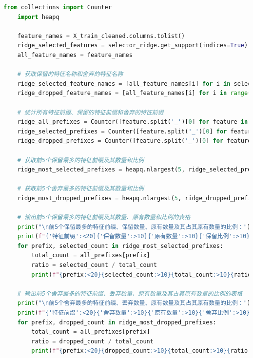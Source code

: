 \documentclass[
    report,     %
    oneside,    %
    UTF8,       %
    zihao=-4    %
]{config} %
\begin{document}
\begin{lstlisting}[label=code:feature_retention_ridge, language=Python, caption=Ridge：Ridge:查看特征选择过程中保留与舍弃的特征]
    from collections import Counter
    import heapq
    
    feature_names = X_train_cleaned.columns.tolist()
    ridge_selected_features = selector_ridge.get_support(indices=True)
    all_feature_names = feature_names
    
    # 获取保留的特征名称和舍弃的特征名称
    ridge_selected_feature_names = [all_feature_names[i] for i in selected_features]
    ridge_dropped_feature_names = [all_feature_names[i] for i in range(X_train_cleaned.shape[1]) if i not in selected_features]
    
    # 统计所有特征前缀、保留的特征前缀和舍弃的特征前缀
    ridge_all_prefixes = Counter([feature.split('_')[0] for feature in all_feature_names])
    ridge_selected_prefixes = Counter([feature.split('_')[0] for feature in ridge_selected_feature_names])
    ridge_dropped_prefixes = Counter([feature.split('_')[0] for feature in ridge_dropped_feature_names])
    
    # 获取前5个保留最多的特征前缀及其数量和比例
    ridge_most_selected_prefixes = heapq.nlargest(5, ridge_selected_prefixes.items(), key=lambda x: x[1])
    
    # 获取前5个舍弃最多的特征前缀及其数量和比例
    ridge_most_dropped_prefixes = heapq.nlargest(5, ridge_dropped_prefixes.items(), key=lambda x: x[1])
    
    # 输出前5个保留最多的特征前缀及其数量、原有数量和比例的表格
    print("\n前5个保留最多的特征前缀、保留数量、原有数量及其占其原有数量的比例：")
    print(f"{'特征前缀':<20}{'保留数量':>10}{'原有数量':>10}{'保留比例':>10}")
    for prefix, selected_count in ridge_most_selected_prefixes:
        total_count = all_prefixes[prefix]
        ratio = selected_count / total_count
        print(f"{prefix:<20}{selected_count:>10}{total_count:>10}{ratio:>10.2%}")
    
    # 输出前5个舍弃最多的特征前缀、丢弃数量、原有数量及其占其原有数量的比例的表格
    print("\n前5个舍弃最多的特征前缀、丢弃数量、原有数量及其占其原有数量的比例：")
    print(f"{'特征前缀':<20}{'舍弃数量':>10}{'原有数量':>10}{'舍弃比例':>10}")
    for prefix, dropped_count in ridge_most_dropped_prefixes:
        total_count = all_prefixes[prefix]
        ratio = dropped_count / total_count
        print(f"{prefix:<20}{dropped_count:>10}{total_count:>10}{ratio:>10.2%}")
\end{lstlisting}
\end{document}

